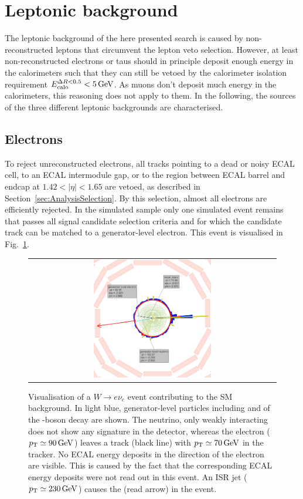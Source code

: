 \section{Leptonic background}
\label{sec:LeptonicBkg}

The leptonic background of the here presented search is caused by non-reconstructed leptons that circumvent the lepton veto selection.
However, at least non-reconstructed electrons or taus should in principle deposit enough energy in the calorimeters such that they can still be vetoed by the calorimeter isolation requirement $E^{\Delta R<0.5}_{\text{calo}}<5\,\text{Ge}\kern-0.06667em\text{V}$.
As muons don't deposit much energy in the calorimeters, this reasoning does not apply to them.
In the following, the sources of the three different leptonic backgrounds are characterised.

\subsection*{Electrons}
To reject unreconstructed electrons, all tracks pointing to a dead or noisy ECAL cell, to an ECAL intermodule gap, or to the region between ECAL barrel and endcap at $1.42<|\eta|<1.65$ are vetoed, 
as described in Section~\ref{sec:AnalysisSelection}.
By this selection, almost all electrons are efficiently rejected.
In the simulated \WJets sample only one simulated event remains that passes all signal candidate selection criteria and for which the candidate track can be matched to a generator-level electron.
This event is visualised in Fig.~\ref{fig:LostElectron}. 
\begin{figure}[!t]
  \centering 
  \begin{tabular}{c}
    \includegraphics[width=0.49\textwidth]{figures/analysis/Electron_lumi_279317_event_111637553.png}
  \end{tabular}
 \caption{Visualisation of a $W\rightarrow e\nu_e$ event contributing to the SM background. 
           In light blue, generator-level particles including \lel and \nue of the \W-boson decay are shown. 
           The neutrino, only weakly interacting does not show any signature in the detector, whereas the electron ($p_{\text{T}}\simeq 90\,\text{Ge}\kern-0.06667em\text{V}$) leaves a track (black line) with \mbox{$p_{\text{T}}\simeq 70\,\text{Ge}\kern-0.06667em\text{V}$} in the tracker. 
           No ECAL energy deposits in the direction of the electron are visible. 
           This is caused by the fact that the corresponding ECAL energy deposits were not read out in this event.
           An ISR jet ($p_{\text{T}}\simeq 230\,\text{Ge}\kern-0.06667em\text{V}$) causes the \met (read arrow) in the event. }
  \label{fig:LostElectron}
\end{figure}
 

